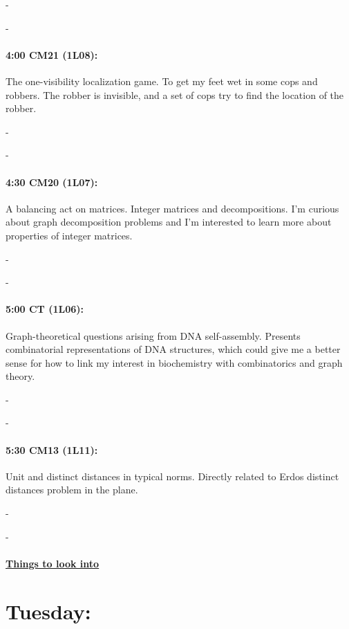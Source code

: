 \documentclass[12]{article}
\theoremstyle{definition}
\begin{document}
	-
	
	-
	
	\paragraph{4:00 CM21 (1L08):} The one-visibility localization game.
	To get my feet wet in some cops and robbers.  The robber is invisible, and a set of cops try to find the location of the robber.
	
	-
	
	-
	
	\paragraph{4:30 CM20 (1L07):} A balancing act on matrices.
	Integer matrices and decompositions.  I'm curious about graph decomposition problems and I'm interested to learn more about properties of integer matrices.
	
	-
	
	-
	
	\paragraph{5:00 CT (1L06):} Graph-theoretical questions arising from DNA self-assembly.
	Presents combinatorial representations of DNA structures, which could give me a better sense for how to link my interest in biochemistry with combinatorics and graph theory.
	
	-
	
	-
	
	\paragraph{5:30 CM13 (1L11):} Unit and distinct distances in typical norms.
	Directly related to Erdos distinct distances problem in the plane.
	
	-
	
	-
	
	\begin{center} 
		\item\paragraph{\underline{Things to look into}} 
		\end{center}
	
	
	\newpage
	\section{Tuesday:}
\end{document}
